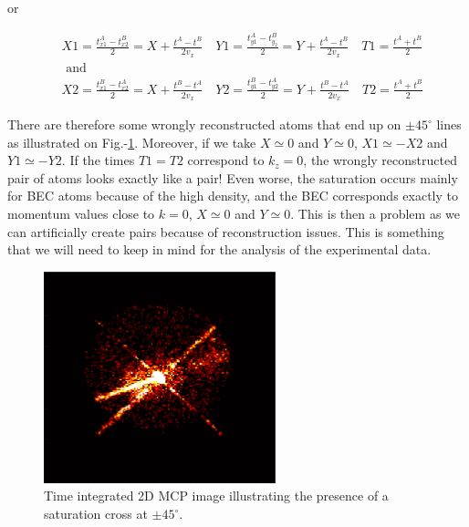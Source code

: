 \noindent or 

\begin{equation}
\begin{aligned}
&X 1=\frac{t_{x 1}^{A}-t_{x 2}^{B}}{2}=X+\frac{t^{A}-t^{B}}{2 v_{x}} \quad Y 1=\frac{t_{y 1}^{A}-t_{y_{2}}^{B}}{2}=Y+\frac{t^{A}-t^{B}}{2 v_{x}} \quad T 1=\frac{t^{A}+t^{B}}{2}\\
&\text { and }\\
&X 2=\frac{t_{x 1}^{B}-t_{x 2}^{A}}{2}=X+\frac{t^{B}-t^{A}}{2 v_{x}} \quad Y 2=\frac{t_{y 1}^{B}-t_{y 2}^{A}}{2}=Y+\frac{t^{B}-t^{A}}{2 v_{x}} \quad T 2=\frac{t^{A}+t^{B}}{2}
\end{aligned}
\end{equation}

There are therefore some wrongly reconstructed atoms that end up on $\pm 45^{\circ}$ lines as illustrated on Fig.-\ref{fig:saturation_cross}. Moreover, if we take $X \simeq 0$ and $Y \simeq 0$, $X1 \simeq -X2$ and $Y1 \simeq -Y2$. If the times $T1=T2$ correspond to $k_z=0$, the wrongly reconstructed pair of atoms looks exactly like a \kmk pair! Even worse, the saturation occurs mainly for BEC atoms because of the high density, and the BEC corresponds exactly to momentum values close to $k=0$, \ie  $X \simeq 0$ and $Y \simeq 0$. This is then a problem as we can artificially create \kmk pairs because of reconstruction issues. This is something that we will need to keep in mind for the analysis of the experimental data.

\begin{figure}
    \centering
    \includegraphics[width=0.6\textwidth]{Fig/Chapter3/saturation_cross.png}
    \caption[Saturation cross]{Time integrated 2D MCP image illustrating the presence of a saturation cross at $\pm 45^{\circ}$.}
    \label{fig:saturation_cross}
\end{figure}


